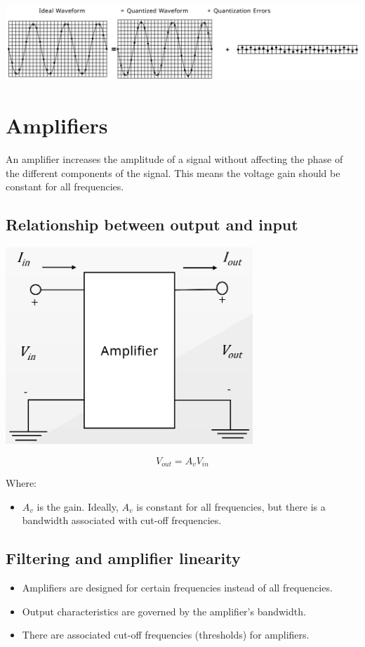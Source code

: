 \documentclass[11pt]{article}
\begin{document}
\begin{center}
\includegraphics[width=.9\linewidth]{./images/quantisation-error-waveform-equation.png}
\end{center}

 \newpage
\section{Amplifiers}
\label{sec:org34dc6a2}
An amplifier increases the amplitude of a signal without affecting the phase of the different components of the signal. This means the voltage gain should be constant for all frequencies.
\subsection{Relationship between output and input}
\label{sec:orgc54853c}
\begin{center}
\includegraphics[height=20em]{./images/amplifier-circuit.png}
\end{center}

\[V_{out} = A_v V_{in}\]

Where:
\begin{itemize}
\item \(A_v\) is the gain. Ideally, \(A_v\) is constant for all frequencies, but there is a bandwidth associated with cut-off frequencies.
\end{itemize}
\subsection{Filtering and amplifier linearity}
\label{sec:org92ae1ec}
\begin{itemize}
\item Amplifiers are designed for certain frequencies instead of all frequencies.
\item Output characteristics are governed by the amplifier's bandwidth.
\item There are associated cut-off frequencies (thresholds) for amplifiers.
\end{itemize}
\end{document}
